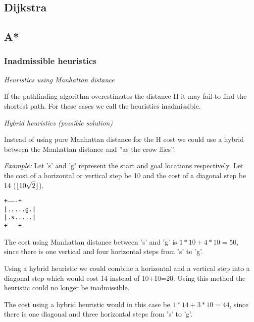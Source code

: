 \documentclass[12pt, a4paper]{article}
\DeclarePairedDelimiter{\floor}{\lfloor}{\rfloor}
\begin{document}

\subsection{Dijkstra}


\subsection{A*}


\subsubsection{Inadmissible heuristics}

\textit{Heuristics using Manhattan distance}

If the pathfinding algorithm overestimates the distance H it may fail to find
the shortest path. For these cases we call the heuristics inadmissible.
\cite{astar2}

\textit{Hybrid heuristics (possible solution)}

Instead of using pure Manhattan distance for the H cost we could use a hybrid
between the Manhattan distance and ''as the crow flies''.

\textit{Example:} Let 's' and 'g' represent the start and goal locations
respectively. Let the cost of a horizontal or vertical step be 10 and the cost
of a diagonal step be 14 ($ \floor{10 \sqrt{2}} $).

\texttt{+-------+ \\
|.....g.| \\
|.s.....| \\
+-------+}

The cost using Manhattan distance between 's' and 'g' is $ 1*10 + 4*10 = 50 $,
since there is one vertical and four horizontal steps from 's' to 'g'.

Using a hybrid heuristic we could combine a horizontal and a vertical step into
a diagonal step which would cost 14 instead of 10+10=20. Using this method the
heuristic could no longer be inadmissible.

The cost using a hybrid heuristic would in this case be $ 1*14 + 3*10 = 44 $,
since there is one diagonal and three horizontal steps from 's' to 'g'.
\end{document}
